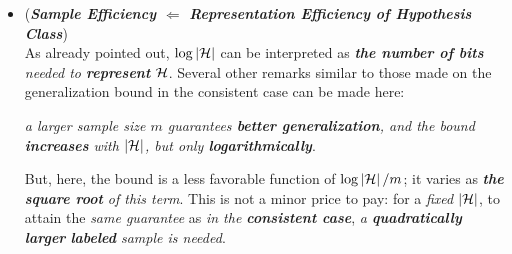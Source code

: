\documentclass[11pt]{article}
\begin{document}
\begin{itemize}
\item \begin{remark} (\emph{\textbf{Sample Efficiency $\Leftarrow$ Representation Efficiency of Hypothesis Class}})\\
As already pointed out, $\log\left\lvert {\mathcal H} \right\rvert$ can be interpreted as \emph{\textbf{the number of bits} needed to \textbf{represent} ${\mathcal H}$}. Several other remarks similar to those made on the generalization bound in the consistent case can be made here: 

\emph{a larger sample size $m$ guarantees \textbf{better generalization}, and the bound \textbf{increases} with $\left\lvert {\mathcal H} \right\rvert$, but only \textbf{logarithmically}}.

But, here, the bound is a less favorable function of $\log\left\lvert {\mathcal H} \right\rvert/m$; it varies as \emph{\textbf{the square root} of this term}. This is not a minor price to pay: for a \emph{fixed} $\left\lvert {\mathcal H} \right\rvert$, to attain the \emph{same guarantee} as \emph{in the \textbf{consistent case}}, \emph{a \textbf{quadratically larger} \textbf{labeled} sample is needed}.
\end{remark}
\end{itemize}
\end{document}
